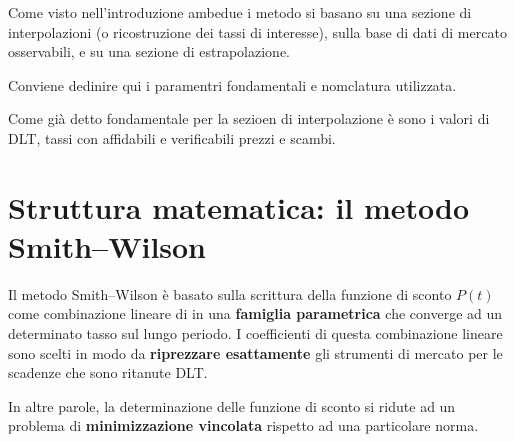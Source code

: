 \documentclass[11pt,a4paper]{article}
\theoremstyle{plain}
\theoremstyle{definition}
\theoremstyle{remark}
\begin{document}

Come visto nell'introduzione ambedue i metodo si basano su una sezione di interpolazioni (o ricostruzione dei tassi di interesse), 
sulla base di dati di mercato osservabili, e su una sezione di estrapolazione.

Conviene dedinire qui i paramentri fondamentali e nomclatura utilizzata.

Come già detto fondamentale per la sezioen di interpolazione è sono i valori di DLT, tassi con affidabili e verificabili prezzi e scambi.



\section{Struttura matematica: il metodo Smith--Wilson}
\label{sec:sw-metodo}


Il metodo Smith--Wilson \`e basato sulla scrittura della funzione di sconto $P(t)$ come 
combinazione lineare di in una \textbf{famiglia
parametrica} che converge ad un determinato tasso sul lungo periodo. 
I coefficienti di questa combinazione lineare sono scelti in modo da
\textbf{riprezzare esattamente} gli strumenti di mercato per le scadenze che sono ritanute DLT. 

In altre parole, la determinazione delle funzione di sconto si ridute ad un
problema di \textbf{minimizzazione vincolata} rispetto ad una particolare norma.
\end{document}
